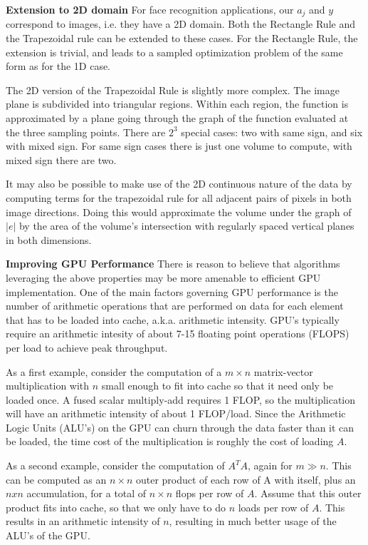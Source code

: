
{\bf Extension to 2D domain} For face recognition applications, our $a_j$ and
$y$ correspond to images, i.e. they have a 2D domain.  Both the Rectangle Rule
and the Trapezoidal rule can be extended to these cases.  For the Rectangle
Rule, the extension is trivial, and leads to a sampled optimization problem of
the same form as for the 1D case.  

The 2D version of the Trapezoidal Rule is slightly more complex.  The image
plane is subdivided into triangular regions.  Within each region, the function
is approximated by a plane going through the graph of the function evaluated at
the three sampling points.  There are $2^3$ special cases: two with same sign,
and six with mixed sign.  For same sign cases there is just one volume to
compute, with mixed sign there are two.  

It may also be possible to make use of the 2D continuous nature of the data by
computing terms for the trapezoidal rule for all adjacent pairs of pixels in
both image directions.  Doing this would approximate the volume under the graph
of $|e|$ by the area of the volume's intersection with regularly spaced
vertical planes in both dimensions.  


{\bf Improving GPU Performance } There is reason to believe that algorithms
leveraging the above properties may be more amenable to efficient GPU
implementation.  One of the main factors governing GPU performance is the
number of arithmetic operations that are performed on data for each element
that has to be loaded into cache, a.k.a. arithmetic intensity.  GPU's typically
require an arithmetic intesity of about 7-15 floating point operations (FLOPS)
per load to achieve peak throughput.  

As a first example, consider the computation of a $m \times n$ matrix-vector
multiplication with $n$ small enough to fit into cache so that it need only be
loaded once.  A fused scalar multiply-add requires 1 FLOP, so the
multiplication will have an arithmetic intensity of about 1 FLOP/load.  Since
the Arithmetic Logic Units (ALU's) on the GPU can churn through the data faster
than it can be loaded, the time cost of the multiplication is roughly the cost
of loading $A$.  

As a second example, consider the computation of $A^T A$, again for $m \gg n$.
This can be computed as an $n \times n$ outer product of each row of A with
itself, plus an $n x n$ accumulation, for a total of $n \times n$ flops per row
of $A$.  Assume that this outer product fits into cache, so that we only have
to do $n$ loads per row of $A$.  This results in an arithmetic intensity of
$n$, resulting in much better usage of the ALU's of the GPU.

